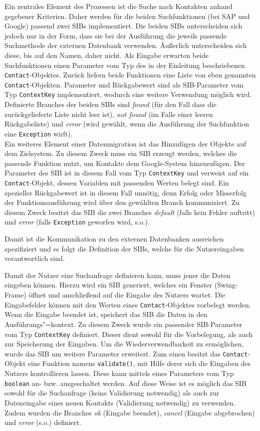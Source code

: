 Ein zentrales Element des Prozessen ist die Suche nach Kontakten anhand gegebener Kriterien.
Daher werden für die beiden Suchfunktionen (bei SAP und Google) passend zwei SIBs implementiert.
Die beiden SIBs unterscheiden sich jedoch nur in der Form, dass sie bei der Ausführung die jeweils passende Suchmethode
 der externen Datenbank verwenden.
Äußerlich unterscheiden sich diese, bis auf den Namen, daher nicht.
Als Eingabe erwarten beide Suchfunktionen einen Parameter vom Typ des in der Einleitung beschriebenen \lstinline{Contact}-Objektes.
Zurück liefern beide Funktionen eine Liste von eben genannten \lstinline{Contact}-Objekten. Parameter und Rückgabewert
 sind als SIB-Parameter vom Typ \lstinline{ContextKey} implementiert, wodurch eine weitere Verwendung möglich wird.
Definierte Branches der beiden SIBs sind \emph{found} (für den Fall dass die zurückgelieferte Liste nicht leer ist),
 \emph{not found} (im Falle einer leeren Rückgabeliste) und \emph{error} (wird gewählt, wenn die Ausführung der
 Suchfunktion eine \lstinline{Exception} wirft).\\

Ein weiteres Element einer Datenmigration ist das Hinzufügen der Objekte auf dem Zielsystem.
Zu diesem Zweck muss ein SIB erzeugt werden, welches die passende Funktion nutzt, um Kontakte dem Google-System hinzuzufügen.
Der Parameter des SIB ist in diesem Fall vom Typ \lstinline{ContextKey} und verweist auf ein \lstinline{Contact}-Objekt,
 dessen Variablen mit passenden Werten belegt sind.
Ein spezieller Rückgabewert ist in diesem Fall unnötig, denn Erfolg oder Misserfolg der Funktionsausführung wird über
 den gewählten Branch kommuniziert.
Zu diesem Zweck besitzt das SIB die zwei Branches \emph{default} (falls kein Fehler auftritt) und \emph{error} (falls
 \lstinline{Exception} geworfen wird, s.o.).

Damit ist die Kommunikation zu den externen Datenbanken ausreichen spezifiziert und es folgt die Definition der SIBs,
 welche für die Nutzereingaben verantwortlich sind.

Damit der Nutzer eine Suchanfrage definieren kann, muss jener die Daten eingeben können.
Hierzu wird ein SIB generiert, welches ein Fenster (Swing-Frame) öffnet und anschließend auf die Eingabe des Nutzers wartet.
Die Eingabefelder können mit den Werten eines \lstinline{Contact}-Objektes vorbelegt werden.
Wenn die Eingabe beendet ist, speichert das SIB die Daten in den Ausführungs"=kontext.
Zu diesem Zweck wurde ein passender SIB-Parameter vom Typ \lstinline{ContextKey} definiert.
Dieser dient sowohl für die Vorbelegung, als auch zur Speicherung der Eingaben.
Um die Wiederverwendbarkeit zu ermöglichen, wurde das SIB um weitere Parameter erweitert.
Zum einen besitzt das \lstinline{Contact}-Objekt eine Funktion namens \lstinline{validate()}, mit Hilfe derer sich die
 Eingaben des Nutzers kontrollieren lassen.
Diese kann mittels eines Parameters vom Typ \lstinline{boolean} an- bzw. ausgeschaltet werden.
Auf diese Weise ist es möglich das SIB sowohl für die Suchanfrage (keine Validierung notwendig) als auch zur Dateneingabe
 eines neuen Kontakts (Validierung notwendig) zu verwenden.
Zudem wurden die Branches \emph{ok} (Eingabe beendet), \emph{cancel} (Eingabe abgebrochen) und \emph{error} (s.o.) definiert.

